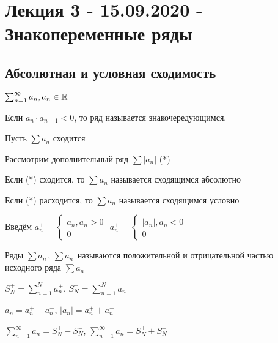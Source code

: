 \section{Лекция 3 - 15.09.2020 - Знакопеременные ряды}
\subsection{Абсолютная и условная сходимость}
\begin{definition}
    $\sum_{n=1}^{\infty} a_n, a_n \in \mathbb{R}$

    Если $a_n \cdot a_{n+1} < 0$, то ряд называется знакочередующимся.
\end{definition}

Пусть $\sum  a_n$ сходится

\begin{definition}
    Рассмотрим дополнительный ряд $\sum\left|a_n\right|$ (*)

    Если (*) сходится, то $\sum a_n$ называется сходящимся абсолютно

    Если (*) расходится, то $\sum a_n$ называется сходящимся условно
\end{definition}


\begin{definition}
    Введём $a_n^{+} = \begin{cases}
        a_n, a_n > 0 \\
        0
    \end{cases}$ 
    $a_n^{+} = \begin{cases}
        |a_n|, a_n < 0 \\
        0
    \end{cases}$ 

    Ряды $\sum a_n^+$, $\sum a_n^-$ называются положительной и отрицательной частью исходного ряда $\sum a_n$
\end{definition}


$S_N^+ = \sum_{n=1}^{N} a_n^+$, $S_N^- = \sum_{n=1}^{N} a_n^-$

$a_n = a_n^+ - a_n^-$, $\left|a_n\right| = a_n^+ + a_n^-$

$\sum_{n=1}^{\infty}a_n = S_N^+ - S_N^-$, $\sum_{n=1}^{\infty}a_n = S_N^+ + S_N^-$

\begin{comment}
    Ряд $\sum a_n$ сходится абсолютно $\iff$ оба ряда $\sum a_n^+$, $\sum a_n^-$ сходятся
    Ряд $\sum a_n$ сходится условно $\implies$ оба ряда $\sum a_n^+$, $\sum a_n^-$ расходятся
\end{comment}


